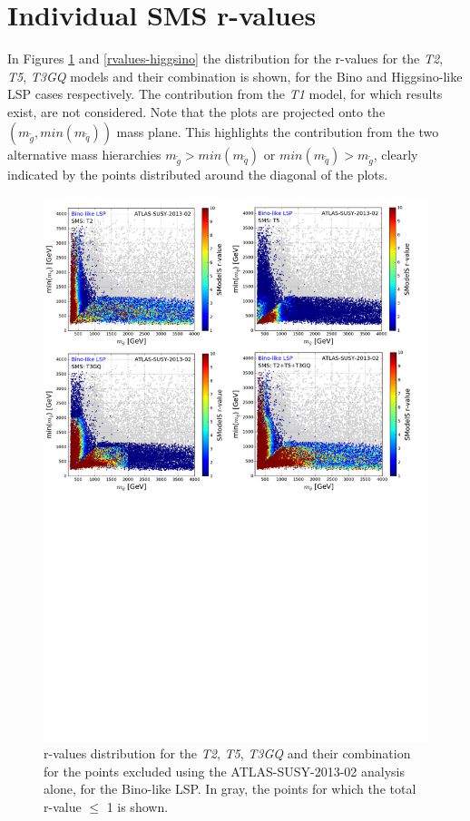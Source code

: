 \documentclass[epj,nopacs,fleqn]{svjour}
\begin{document}
\section{Individual SMS r-values}
In Figures \ref{rvalues-bino} and \ref{rvalues-higgsino} the distribution for the r-values for the \textit{T2}, \textit{T5}, \textit{T3GQ} models and their combination is shown, for the Bino and Higgsino-like LSP cases respectively. The contribution from the \textit{T1} model, for which results exist, are not considered. Note that the plots are projected onto the $(m_{\tilde g}, min(m_{\tilde q}))$ mass plane. This highlights the contribution from the two alternative mass hierarchies $m_{\tilde g} > min(m_{\tilde q})$ or $min(m_{\tilde q}) > m_{\tilde g} $, clearly indicated by the points distributed around the diagonal of the plots. 
\\
\begin{figure}[!]
\begin{center}
\includegraphics[width=1\textwidth]{PLOTS/App/Bino_Combo.pdf}
\end{center}
\caption{r-values distribution for the \textit{T2}, \textit{T5}, \textit{T3GQ} and their combination for the points excluded using the ATLAS-SUSY-2013-02 analysis alone, for the Bino-like LSP. In gray, the points for which the total r-value $\leq$ 1 is shown.} 
\label{rvalues-bino}
\end{figure}
\\
\end{document}
